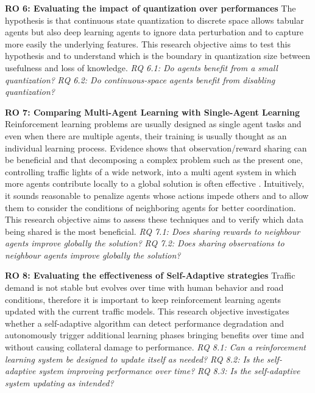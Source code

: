 \hfill \break
\noindent
\textbf{\hypertarget{ro6}{RO 6}: Evaluating the impact of quantization over performances}
\hfill \break
The hypothesis is that continuous state quantization to discrete space allows tabular agents but also deep learning agents to ignore data perturbation and to capture more easily the underlying features.
This research objective aims to test this hypothesis and to understand which is the boundary in quantization size between usefulness and loss of knowledge.
\hfill \break
\textit{\hypertarget{rq6.1}{RQ 6.1}: Do agents benefit from a small quantization?}
\hfill \break
\textit{\hypertarget{rq6.2}{RQ 6.2}: Do continuous-space agents benefit from disabling quantization?}

\hfill \break
\noindent
\textbf{\hypertarget{ro7}{RO 7}: Comparing Multi-Agent Learning with Single-Agent Learning}
\hfill \break
Reinforcement learning problems are usually designed as single agent tasks and even when there are multiple agents, their training is usually thought as an individual learning process.
Evidence shows that observation/reward sharing can be beneficial and that decomposing a complex problem such as the present one, controlling traffic lights of a wide network, into a multi agent system in which more agents contribute locally to a global solution is often effective \cite{panait2005cooperative}.
Intuitively, it sounds reasonable to penalize agents whose actions impede others and to allow them to consider the conditions of neighboring agents for better coordination.
This research objective aims to assess these techniques and to verify which data being shared is the most beneficial.
\hfill \break
\textit{\hypertarget{rq7.1}{RQ 7.1}: Does sharing rewards to neighbour agents improve globally the solution?}
\hfill \break
\textit{\hypertarget{rq7.2}{RQ 7.2}: Does sharing observations to neighbour agents improve globally the solution?}

\hfill \break
\noindent
\textbf{\hypertarget{ro8}{RO 8}: Evaluating the effectiveness of Self-Adaptive strategies}
\hfill \break
Traffic demand is not stable but evolves over time with human behavior and road conditions, therefore it is important to keep reinforcement learning agents updated with the current traffic models.
This research objective investigates whether a self-adaptive algorithm can detect performance degradation and autonomously trigger additional learning phases bringing benefits over time and without causing collateral damage to performance.
\hfill \break
\textit{\hypertarget{rq8.1}{RQ 8.1}: Can a reinforcement learning system be designed to update itself as needed?}
\hfill \break
\textit{\hypertarget{rq8.2}{RQ 8.2}: Is the self-adaptive system improving performance over time?}
\hfill \break
\textit{\hypertarget{rq8.3}{RQ 8.3}: Is the self-adaptive system updating as intended?}

